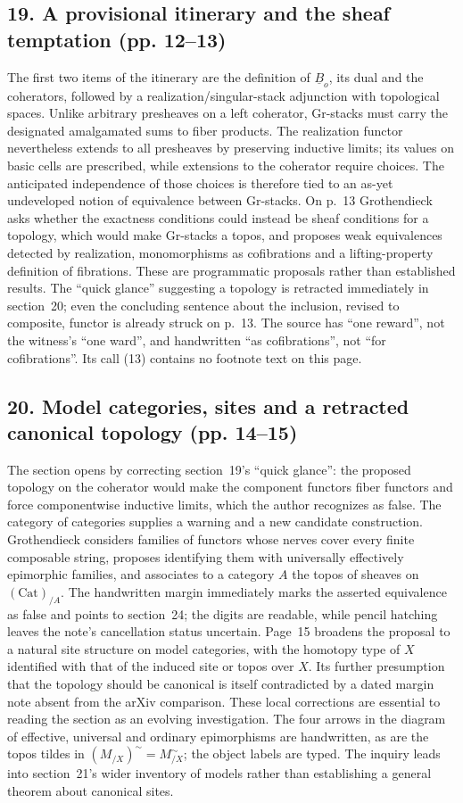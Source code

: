\subsection*{19. A provisional itinerary and the sheaf temptation (pp. 12--13)}
The first two items of the itinerary are the definition of $\underline B_o$, its dual and the coherators, followed by a realization/singular-stack adjunction with topological spaces. Unlike arbitrary presheaves on a left coherator, Gr-stacks must carry the designated amalgamated sums to fiber products. The realization functor nevertheless extends to all presheaves by preserving inductive limits; its values on basic cells are prescribed, while extensions to the coherator require choices. The anticipated independence of those choices is therefore tied to an as-yet undeveloped notion of equivalence between Gr-stacks. On p.~13 Grothendieck asks whether the exactness conditions could instead be sheaf conditions for a topology, which would make Gr-stacks a topos, and proposes weak equivalences detected by realization, monomorphisms as cofibrations and a lifting-property definition of fibrations. These are programmatic proposals rather than established results. The ``quick glance'' suggesting a topology is retracted immediately in section~20; even the concluding sentence about the inclusion, revised to composite, functor is already struck on p.~13. The source has ``one reward'', not the witness's ``one ward'', and handwritten ``as cofibrations'', not ``for cofibrations''. Its call (13) contains no footnote text on this page.

\subsection*{20. Model categories, sites and a retracted canonical topology (pp. 14--15)}
The section opens by correcting section~19's ``quick glance'': the proposed topology on the coherator would make the component functors fiber functors and force componentwise inductive limits, which the author recognizes as false. The category of categories supplies a warning and a new candidate construction. Grothendieck considers families of functors whose nerves cover every finite composable string, proposes identifying them with universally effectively epimorphic families, and associates to a category $A$ the topos of sheaves on $(\mathrm{Cat})_{/A}$. The handwritten margin immediately marks the asserted equivalence as false and points to section~24; the digits are readable, while pencil hatching leaves the note's cancellation status uncertain. Page~15 broadens the proposal to a natural site structure on model categories, with the homotopy type of $X$ identified with that of the induced site or topos over $X$. Its further presumption that the topology should be canonical is itself contradicted by a dated margin note absent from the arXiv comparison. These local corrections are essential to reading the section as an evolving investigation. The four arrows in the diagram of effective, universal and ordinary epimorphisms are handwritten, as are the topos tildes in $(M_{/X})^{\sim}=M^{\sim}_{/X}$; the object labels are typed. The inquiry leads into section~21's wider inventory of models rather than establishing a general theorem about canonical sites.

